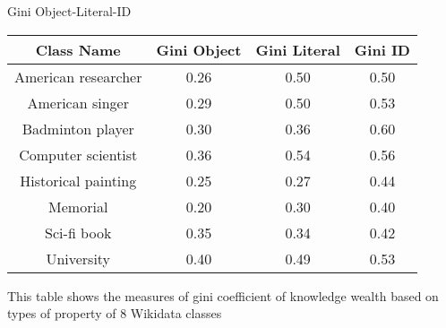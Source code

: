 \begin{center}
    \small
    \begin{threeparttable}
    \caption{Gini Object-Literal-ID}
    \label{tab:gini proptype}
    \begin{tabular}{c c c c} 
    
    \toprule
        Class Name & Gini Object & Gini Literal & Gini ID \\ [0.5ex] 
    \midrule
        American researcher & 0.26 & 0.50 & 0.50 \\
        American singer & 0.29 & 0.50 & 0.53 \\
        Badminton player & 0.30 & 0.36 & 0.60 \\
        Computer scientist & 0.36 & 0.54 & 0.56 \\
        Historical painting & 0.25 & 0.27 & 0.44 \\
        Memorial & 0.20 & 0.30 & 0.40 \\
        Sci-fi book & 0.35 & 0.34 & 0.42 \\
        University & 0.40 & 0.49 & 0.53 \\
        [1ex]
    \bottomrule
    \end{tabular}
    \begin{tablenotes}
        \footnotesize
        This table shows the measures of gini coefficient of knowledge wealth based on types of property of 8 Wikidata classes
    \end{tablenotes}
    \end{threeparttable}
\end{center}